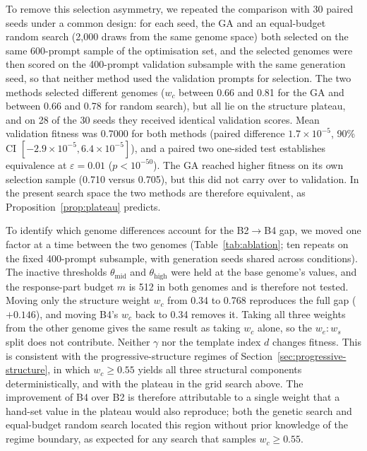 \documentclass[mathematics,article,submit,xetex,moreauthors]{Definitions/mdpi}
\begin{document}
To remove this selection asymmetry, we repeated the comparison with 30 paired
seeds under a common design: for each seed, the GA and an equal-budget random
search (2,000 draws from the same genome space) both selected on the same
600-prompt sample of the optimisation set, and the selected genomes were then
scored on the 400-prompt validation subsample with the same generation seed, so
that neither method used the validation prompts for selection. The two methods
selected different genomes ($w_c$ between 0.66 and 0.81 for the GA and between
0.66 and 0.78 for random search), but all lie on the structure plateau, and on
28 of the 30 seeds they received identical validation scores. Mean validation
fitness was 0.7000 for both methods (paired difference $1.7\times10^{-5}$, 90\%
CI $[-2.9\times10^{-5}, 6.4\times10^{-5}]$), and a paired two one-sided test
establishes equivalence at $\varepsilon=0.01$ ($p<10^{-50}$). The GA reached
higher fitness on its own selection sample (0.710 versus 0.705), but this did not
carry over to validation. In the present search space the two methods are
therefore equivalent, as Proposition~\ref{prop:plateau} predicts.

To identify which genome differences account for the B2$\to$B4 gap, we moved one factor at a time between the two genomes (Table~\ref{tab:ablation}; ten repeats on the fixed 400-prompt subsample, with generation seeds shared across conditions). The inactive thresholds $\theta_\mathrm{mid}$ and $\theta_\mathrm{high}$ were held at the base genome's values, and the response-part budget $m$ is 512 in both genomes and is therefore not tested. Moving only the structure weight $w_c$ from 0.34 to 0.768 reproduces the full gap ($+0.146$), and moving B4's $w_c$ back to 0.34 removes it. Taking all three weights from the other genome gives the same result as taking $w_c$ alone, so the $w_e{:}w_s$ split does not contribute. Neither $\gamma$ nor the template index $d$ changes fitness. This is consistent with the progressive-structure regimes of Section~\ref{sec:progressive-structure}, in which $w_c\ge0.55$ yields all three structural components deterministically, and with the plateau in the grid search above. The improvement of B4 over B2 is therefore attributable to a single weight that a hand-set value in the plateau would also reproduce; 
both the genetic search and equal-budget random search located this region without prior knowledge of the regime boundary, as expected for any search that samples $w_c\ge0.55$.
\end{document}
